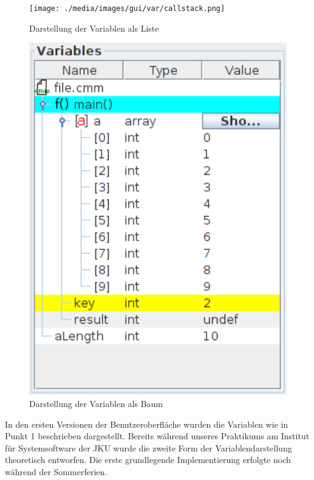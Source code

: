 \begin{figure}[h!]
\centering
	\begin{minipage}{0.50\textwidth}
		\centering
		\texttt{[image: ./media/images/gui/var/callstack.png]}
		\caption{Darstellung der Variablen als Liste}\label{fig:deb-var-m1}
	\end{minipage}\hfill
	\begin{minipage}{0.45\textwidth}
		\centering
		\includegraphics[width=1.0\textwidth]{./media/images/gui/var/treetable2.png}
		\caption{Darstellung der Variablen als Baum}\label{fig:deb-var-m2}
	\end{minipage}
\end{figure}

In den ersten Versionen der Benutzeroberfläche wurden die Variablen wie in Punkt 1 beschrieben dargestellt. Bereits während unseres Praktikums am Institut für Systemsoftware der JKU wurde die zweite Form der Variablendarstellung theoretisch entworfen. Die erste grundlegende Implementierung erfolgte noch während der Sommerferien.

